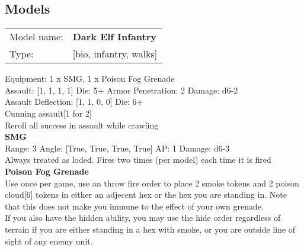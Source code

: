 \clearpage

\subsection{ Models }

\begin{tabular}{ll}
Model name: & {\bf Dark Elf Infantry } \\
Type: & [bio, infantry, walks] \\
\end{tabular}

Equipment: 1 x SMG, 1 x Poison Fog Grenade \\

Assault: [1, 1, 1, 1] Die: 5+ Armor Penetration: 2 Damage: d6-2 \\
Assault Deflection: [1, 1, 0, 0] Die: 6+\\
\indent Cunning assault[1 for 2]\\ 
Reroll all success in assault while crawling\\ 
 



{\bf SMG } \\



Range: 3  Angle: [True, True, True, True] AP: 1 Damage: d6-3 \\
Always treated as loded. Fires two times (per model) each time it is fired\\ 




{\bf Poison Fog Grenade } \\

Use once per game, use an throw fire order to place 2 smoke tokens and 2 poison cloud[6] tokens in either an adjecent hex or the hex you are standing in. Note that this does not make you immune to the effect of your own grenade.\\ 
If you also have the hidden ability, you may use the hide order regardless of terrain if you are either standing in a hex with smoke, or you are outside line of sight of any enemy unit. \\ 





 















